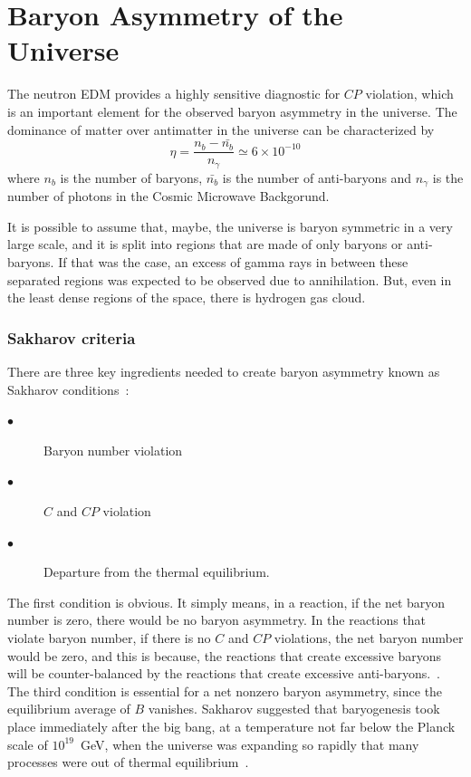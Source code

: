\section{Baryon Asymmetry of the Universe}
The neutron EDM provides a highly sensitive diagnostic for $CP$
violation, which is an important element for the observed
baryon asymmetry in the universe.  The dominance of matter over
antimatter in the universe can be characterized by~\cite{Cline}
\begin{equation}
\eta = \frac{n_b-\bar{n_b}}{n_{\gamma}} \simeq 6 \times 10^{-10}
\end{equation}
where $n_b$ is the number of baryons, $\bar{n_b}$ is the number of
anti-baryons and $n_{\gamma}$ is the number of photons in the Cosmic
Microwave Backgorund.

It is possible to assume that, maybe, the universe is baryon symmetric
in a very large scale, and it is split into regions that are made of
only baryons or anti-baryons. If that was the case, an excess of gamma
rays in between these separated regions was expected to be observed
due to annihilation. But, even in the least dense regions of the
space, there is hydrogen gas cloud.

\subsubsection{Sakharov criteria}
There are three key ingredients needed to
create baryon asymmetry known as Sakharov conditions~\cite{Sakharov:1967dj}:
\begin{center}
\begin{description}
\item[$\bullet$]Baryon number violation
\item[$\bullet$] $C$ and $CP$ violation
\item[$\bullet$] Departure from the thermal equilibrium.
\end{description}
\end{center}

The first condition is obvious. It simply means, in a reaction, if the
net baryon number is zero, there would be no baryon asymmetry. In the
reactions that violate baryon number, if there is no $C$ and $CP$
violations, the net baryon number would be zero, and this is because,
the reactions that create excessive baryons will be counter-balanced
by the reactions that create excessive
anti-baryons.~\cite{theearlyuniverse}. The third condition is
essential for a net nonzero baryon asymmetry, since the equilibrium
average of $B$ vanishes. Sakharov suggested that baryogenesis took
place immediately after the big bang, at a temperature not far below
the Planck scale of $10^{19}$~GeV, when the universe was expanding so
rapidly that many processes were out of thermal
equilibrium~\cite{cohen1993progress}.

